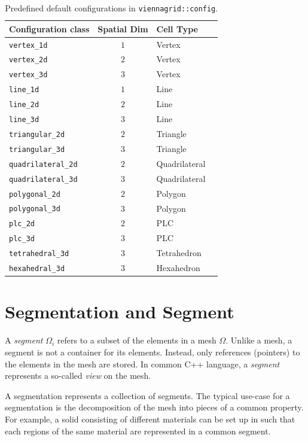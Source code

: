 \begin{table}[tbp]
 \centering
 \renewcommand{\arraystretch}{1.3}
\begin{tabular}{|l|c|l|l|}
\hline
 Configuration class  & Spatial Dim & Cell Type \\
\hline
 \lstinline|vertex_1d|          & $1$ & Vertex \\
 \lstinline|vertex_2d|          & $2$ & Vertex \\
 \lstinline|vertex_3d|          & $3$ & Vertex \\
 \lstinline|line_1d|            & $1$ & Line \\
 \lstinline|line_2d|            & $2$ & Line \\
 \lstinline|line_3d|            & $3$ & Line \\
 \lstinline|triangular_2d|      & $2$ & Triangle \\
 \lstinline|triangular_3d|      & $3$ & Triangle \\
 \lstinline|quadrilateral_2d|   & $2$ & Quadrilateral \\
 \lstinline|quadrilateral_3d|   & $3$ & Quadrilateral \\
 \lstinline|polygonal_2d|       & $2$ & Polygon \\
 \lstinline|polygonal_3d|       & $3$ & Polygon \\
 \lstinline|plc_2d|             & $2$ & PLC \\
 \lstinline|plc_3d|             & $3$ & PLC \\
 \lstinline|tetrahedral_3d|     & $3$ & Tetrahedron \\
 \lstinline|hexahedral_3d|      & $3$ & Hexahedron \\
\hline
\end{tabular}
\caption{Predefined default configurations in \lstinline|viennagrid::config|.}
\label{tab:mesh-configs}
\end{table}

\section{Segmentation and Segment}
A \emph{segment} $\Omega_i$ refers to a subset of the elements in a mesh $\Omega$. Unlike a mesh, a segment is not a container for its elements. Instead, only references (pointers) to the elements in the mesh are stored. In common C++ language, a \emph{segment} represents a so-called \emph{view} on the mesh.

A segmentation represents a collection of segments. The typical use-case for a segmentation is the decomposition of the mesh into pieces of a common property. For example, a solid consisting of different materials can be set up in {\ViennaGrid} such that each regions of the same material are represented in a common segment.
